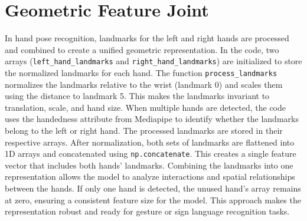 \section{Geometric Feature Joint}
In hand pose recognition, landmarks for the left and right hands are processed and combined to create a unified geometric representation. In the code, two arrays (\verb|left_hand_landmarks| and \verb|right_hand_landmarks|) are initialized to store the normalized landmarks for each hand. The function \verb|process_landmarks| normalizes the landmarks relative to the wrist (landmark 0) and scales them using the distance to landmark 5. This makes the landmarks invariant to translation, scale, and hand size.
When multiple hands are detected, the code uses the handedness attribute from Mediapipe to identify whether the landmarks belong to the left or right hand. The processed landmarks are stored in their respective arrays. After normalization, both sets of landmarks are flattened into 1D arrays and concatenated using \verb|np.concatenate|. This creates a single feature vector that includes both hands' landmarks.
Combining the landmarks into one representation allows the model to analyze interactions and spatial relationships between the hands. If only one hand is detected, the unused hand's array remains at zero, ensuring a consistent feature size for the model. This approach makes the representation robust and ready for gesture or sign language recognition tasks.